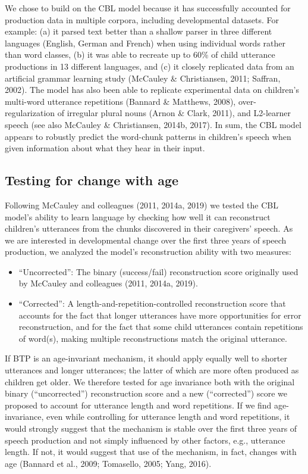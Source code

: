 \documentclass[man,mask,floatsintext]{apa6}
\providecommand{\tightlist}{%
  \setlength{\itemsep}{0pt}\setlength{\parskip}{0pt}}
\begin{document}
We chose to build on the CBL model because it has successfully accounted
for production data in multiple corpora, including developmental
datasets. For example: (a) it parsed text better than a shallow parser
in three different languages (English, German and French) when using
individual words rather than word classes, (b) it was able to recreate
up to 60\% of child utterance productions in 13 different languages, and
(c) it closely replicated data from an artificial grammar learning study
(McCauley \& Christiansen, 2011; Saffran, 2002). The model has also been
able to replicate experimental data on children's multi-word utterance
repetitions (Bannard \& Matthews, 2008), over-regularization of
irregular plural nouns (Arnon \& Clark, 2011), and L2-learner speech
(see also McCauley \& Christiansen, 2014b, 2017). In sum, the CBL model
appears to robustly predict the word-chunk patterns in children's speech
when given information about what they hear in their input.

\subsection{Testing for change with
age}\label{testing-for-change-with-age}

Following McCauley and colleagues (2011, 2014a, 2019) we tested the CBL
model's ability to learn language by checking how well it can
reconstruct children's utterances from the chunks discovered in their
caregivers' speech. As we are interested in developmental change over
the first three years of speech production, we analyzed the model's
reconstruction ability with two measures:

\begin{itemize}
\tightlist
\item
  \enquote{Uncorrected}: The binary (success/fail) reconstruction score
  originally used by McCauley and colleagues (2011, 2014a, 2019).
\item
  \enquote{Corrected}: A length-and-repetition-controlled reconstruction
  score that accounts for the fact that longer utterances have more
  opportunities for error reconstruction, and for the fact that some
  child utterances contain repetitions of word(s), making multiple
  reconstructions match the original utterance.
\end{itemize}

If BTP is an age-invariant mechanism, it should apply equally well to
shorter utterances and longer utterances; the latter of which are more
often produced as children get older. We therefore tested for age
invariance both with the original binary (\enquote{uncorrected})
reconstruction score and a new (\enquote{corrected}) score we proposed
to account for utterance length and word repetitions. If we find
age-invariance, even while controlling for utterance length and word
repetitions, it would strongly suggest that the mechanism is stable over
the first three years of speech production and not simply influenced by
other factors, e.g., utterance length. If not, it would suggest that use
of the mechanism, in fact, changes with age (Bannard et al., 2009;
Tomasello, 2005; Yang, 2016).
\end{document}
